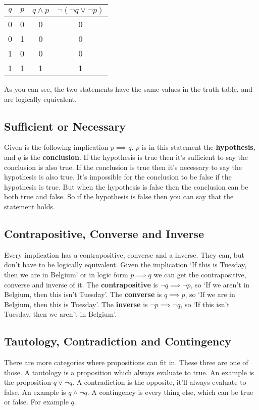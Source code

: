\begin{table}[h]
	\centering
	\begin{tabular}{c | c | c | c}
		\(q\) & \(p\) & \(q \land p\) & \(\neg(\neg q \lor \neg p)\) \\
		\hline
		0     & 0     & 0             & 0                            \\
		0     & 1     & 0             & 0                            \\
		1     & 0     & 0             & 0                            \\
		1     & 1     & 1             & 1                            \\
	\end{tabular}
\end{table}

As you can see, the two statements have the same values in the truth table, and are logically equivalent.

\subsection{Sufficient or Necessary}
Given is the following implication \(p \implies q\).
\(p\) is in this statement the {\bf hypothesis}, and \(q\) is the {\bf conclusion}.
If the hypothesis is true then it's sufficient to say the conclusion is also true.
If the conclusion is true then it's necessary to say the hypothesis is also true.
It's impossible for the conclusion to be false if the hypothesis is true.
But when the hypothesis is false then the conclusion can be both true and false.
So if the hypothesis is false then you can say that the statement holds.

\subsection{Contrapositive, Converse and Inverse}
Every implication has a contrapositive, converse and a inverse.
They can, but don't have to be logically equivalent.
Given the implication `If this is Tuesday, then we are in Belgium' or in logic form \(p \implies q\)
we can get the contrapositive, converse and inverse of it.
The {\bf contrapositive} is \(\neg q \implies \neg p\), so `If we aren't in Belgium, then this isn't Tuesday'.
The {\bf converse} is \(q \implies p\), so `If we are in Belgium, then this is Tuesday'.
The {\bf inverse } is \(\neg p \implies \neg q\), so `If this isn't Tuesday, then we aren't in Belgium'.

\subsection{Tautology, Contradiction and Contingency}
There are more categories where propositions can fit in. These three are one of those.
A tautology is a proposition which always evaluate to true. An example is the proposition \(q \lor \neg q\).
A contradiction is the opposite, it'll always evaluate to false. An example is \(q \land \neg q\).
A contingency is every thing else, which can be true or false. For example \(q\).

